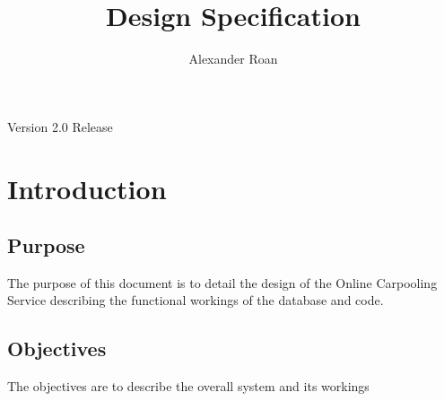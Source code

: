 \documentclass[11pt]{article}
\begin{document}
\begin{titlepage}
\title{Design Specification}
\author{Alexander Roan}
\maketitle
\begin{center}
Version 2.0 Release
\end{center}
\end{titlepage}

\tableofcontents
\newpage
\section{Introduction}
\subsection{Purpose}
The purpose of this document is to detail the design of the Online Carpooling Service describing the functional workings of the database and code.

\subsection{Objectives}
The objectives are to describe the overall system and its workings
\end{document}
